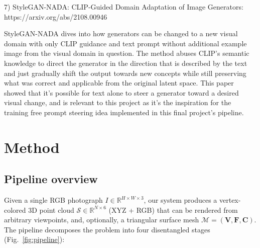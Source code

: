 \documentclass{article}
\begin{document}
7) StyleGAN-NADA: CLIP-Guided Domain Adaptation of Image Generators: https://arxiv.org/abs/2108.00946

StyleGAN-NADA dives into how generators can be changed to a new visual domain with only CLIP guidance and text prompt without additional example image from the visual domain in question. The method abuses CLIP's semantic knowledge to direct the generator in the direction that is described by the text and just gradually shift the output towards new concepts while still preserving what was correct and applicable from the original latent space. This paper showed that it's possible for text alone to steer a generator toward a desired visual change, and is relevant to this project as it's the inspiration for the training free prompt steering idea implemented in this final project's pipeline.

\section{Method}
\label{sec:method}

\subsection{Pipeline overview}
\label{sec:method-overview}

Given a single RGB photograph $I \in \mathbb{R}^{H \times W \times 3}$, our
system produces a vertex-colored 3D point cloud
$\mathcal{S} \in \mathbb{R}^{N \times 6}$ (XYZ + RGB) that can be rendered
from arbitrary viewpoints, and, optionally, a triangular surface mesh
$\mathcal{M} = (\mathbf{V}, \mathbf{F}, \mathbf{C})$. The pipeline
decomposes the problem into four disentangled stages
(Fig.~\ref{fig:pipeline}):
\end{document}
